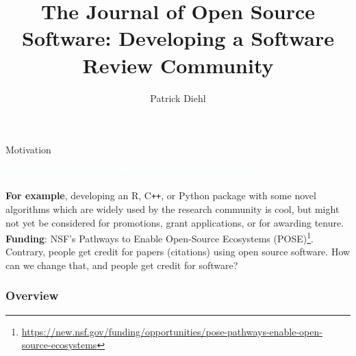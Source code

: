 \documentclass{beamer}
\title[JOSS]{The Journal of Open Source Software: Developing a Software Review Community} %
\author{Patrick Diehl}
\institute[LSU] %
{
Applied Computer Science \\ Los Alamos National Laboratory \\ Department of Physics and Astronomy \\ Louisiana State University \\ %
\medskip
\textit{diehlpk@lanl.gov} %
}
\begin{document}
\begin{frame}
\titlepage
\end{frame}

\begin{frame}{Motivation}

\begin{center}
    \textcolor{azure}{(Open source) software is essential for computational sciences}
\end{center}

\textbf{For example}, developing an R, C\texttt{++}, or Python package with some novel algorithms which are widely used by the research community is cool, but might not yet be considered for promotions, grant applications, or for awarding tenure. \\
\vspace{0.25cm}
\textbf{Funding}: NSF's Pathways to Enable Open-Source Ecosystems (POSE)\footnote{\tiny\url{https://new.nsf.gov/funding/opportunities/pose-pathways-enable-open-source-ecosystems}}. \\
\vspace{0.25cm}
\textcolor{awesome}{Contrary}, people get credit for papers (citations) using open source software. How can we change that, and people get credit for software?  
\end{frame}

\begin{frame}
\frametitle{Overview} %
\tableofcontents %
\end{frame}



%
\end{document}
